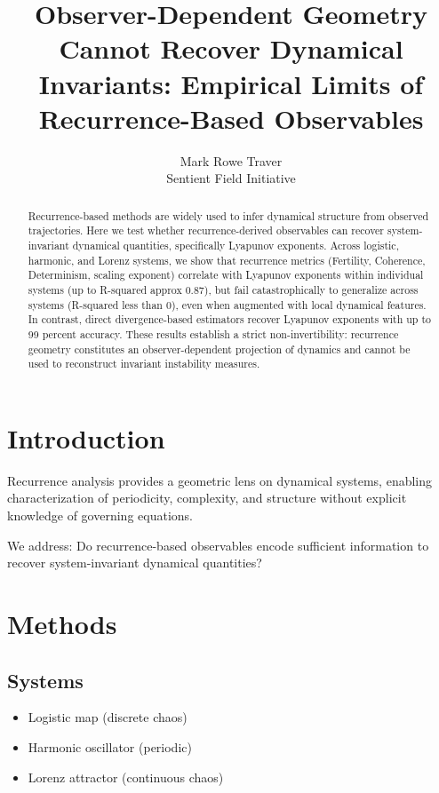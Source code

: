 \documentclass[11pt]{article}
\title{
Observer-Dependent Geometry Cannot Recover Dynamical Invariants: Empirical Limits of Recurrence-Based Observables
}
\author{Mark Rowe Traver \\ Sentient Field Initiative}
\date{}
\begin{document}
\maketitle

\begin{abstract}
	Recurrence-based methods are widely used to infer dynamical structure from observed trajectories. Here we test whether recurrence-derived observables can recover system-invariant dynamical quantities, specifically Lyapunov exponents. Across logistic, harmonic, and Lorenz systems, we show that recurrence metrics (Fertility, Coherence, Determinism, scaling exponent) correlate with Lyapunov exponents within individual systems (up to R-squared approx 0.87), but fail catastrophically to generalize across systems (R-squared less than 0), even when augmented with local dynamical features. In contrast, direct divergence-based estimators recover Lyapunov exponents with up to 99 percent accuracy. These results establish a strict non-invertibility: recurrence geometry constitutes an observer-dependent projection of dynamics and cannot be used to reconstruct invariant instability measures.
\end{abstract}

\section{Introduction}

Recurrence analysis provides a geometric lens on dynamical systems, enabling characterization of periodicity, complexity, and structure without explicit knowledge of governing equations.

We address: Do recurrence-based observables encode sufficient information to recover system-invariant dynamical quantities?

\section{Methods}

\subsection{Systems}

\begin{itemize}
	\item Logistic map (discrete chaos)
	\item Harmonic oscillator (periodic)
	\item Lorenz attractor (continuous chaos)
\end{itemize}
\end{document}
